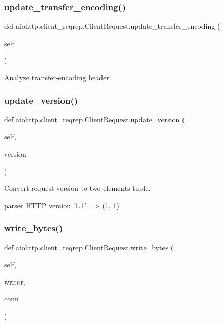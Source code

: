 \subsubsection{\texorpdfstring{update\+\_\+transfer\+\_\+encoding()}{update\_transfer\_encoding()}}
{\footnotesize\ttfamily def aiohttp.\+client\+\_\+reqrep.\+Client\+Request.\+update\+\_\+transfer\+\_\+encoding (\begin{DoxyParamCaption}\item[{}]{self }\end{DoxyParamCaption})}

\begin{DoxyVerb}Analyze transfer-encoding header.\end{DoxyVerb}
 \mbox{\label{classaiohttp_1_1client__reqrep_1_1_client_request_a2468c62a8de0cbdec88459a18e1684ff}} 
\subsubsection{\texorpdfstring{update\+\_\+version()}{update\_version()}}
{\footnotesize\ttfamily def aiohttp.\+client\+\_\+reqrep.\+Client\+Request.\+update\+\_\+version (\begin{DoxyParamCaption}\item[{}]{self,  }\item[{}]{version }\end{DoxyParamCaption})}

\begin{DoxyVerb}Convert request version to two elements tuple.

parser HTTP version '1.1' => (1, 1)
\end{DoxyVerb}
 \mbox{\label{classaiohttp_1_1client__reqrep_1_1_client_request_a7514dbf7e2978859fab260c804fe52c9}} 
\subsubsection{\texorpdfstring{write\+\_\+bytes()}{write\_bytes()}}
{\footnotesize\ttfamily def aiohttp.\+client\+\_\+reqrep.\+Client\+Request.\+write\+\_\+bytes (\begin{DoxyParamCaption}\item[{}]{self,  }\item[{}]{writer,  }\item[{}]{conn }\end{DoxyParamCaption})}

